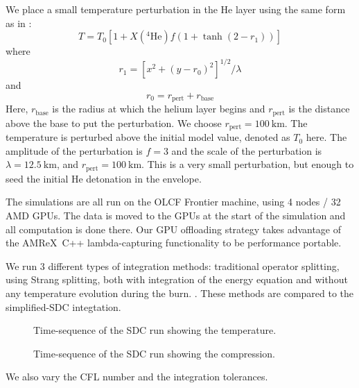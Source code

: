 \documentclass[linenumbers,trackchanges]{aastex631}
\newcommand{\isotm}[2]{{}^{#2}\mathrm{#1}}
\newcommand{\amrex}{{\sf AMReX}}
\newcommand{\MarginPar}[1]{
    \marginpar{\vskip-\baselineskip%
               \raggedright%
               \tiny\sffamily%
               {\color{red}\hrule%
               \smallskip%
               #1\par%
               \smallskip%
               \hrule}}%
}
\begin{document}
We place a small temperature perturbation in the He layer using the
same form as in \citet{castro_simple_sdc}:
\begin{equation}
  T = T_0 \left [ 1 + X(\isotm{He}{4}) f (1 + \tanh(2 - r_1)) \right ]
\end{equation}
where
\begin{equation}
  r_1 = \left [ x^2 + (y - r_0)^2 \right ]^{1/2} / \lambda
\end{equation}
and
\begin{equation}
  r_0 = r_\mathrm{pert} + r_\mathrm{base}
\end{equation}
Here, $r_\mathrm{base}$ is the radius at which the helium layer begins
and $r_\mathrm{pert}$ is the distance above the base to put the
perturbation.  We choose $r_\mathrm{pert} = 100~\mathrm{km}$.  The
temperature is perturbed above the initial model value, denoted as
$T_0$ here.  The amplitude of the perturbation is $f = 3$ and the
scale of the perturbation is $\lambda = 12.5~\mathrm{km}$, and
$r_\mathrm{pert} = 100~\mathrm{km}$.  This is a very small
perturbation, but enough to seed the initial He detonation in the
envelope.



The simulations are all run on the OLCF Frontier machine, using 4
nodes / 32 AMD GPUs.  The data is moved to the GPUs at the start of
the simulation and all computation is done there.  Our GPU offloading
strategy takes advantage of the \amrex\ C++ lambda-capturing
functionality to be performance portable.


We run 3 different types of integration methods: traditional operator
splitting, using Strang splitting, both with integration of the energy
equation and without any temperature evolution during the burn.  \MarginPar{comment about the EOS}.  These methods are compared to the simplified-SDC integtation.

\begin{figure*}[t]
\centering
{}
\caption{\label{fig:temp_sequence} Time-sequence of the SDC run showing the temperature.}
\end{figure*}

\begin{figure*}[t]
\centering
{}
\caption{\label{fig:lap_rho_sequence} Time-sequence of the SDC run showing the compression.}
\end{figure*}


We also vary the CFL number and the integration tolerances.
\end{document}
